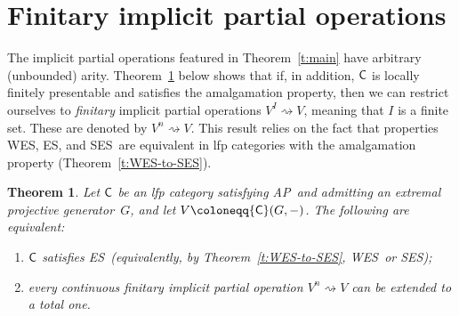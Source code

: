 \documentclass[a4paper,10pt,reqno]{amsart}
\newtheorem{theorem}{Theorem}[section]
\theoremstyle{definition}
\theoremstyle{remark}
\newcommand{\cat}{{\sf C}}								%
\newcommand{\ES}{\textnormal{ES}}
\newcommand{\WES}{\textnormal{WES}}
\newcommand{\SES}{\textnormal{SES}}
\newcommand{\AP}{\textnormal{AP}}
\begin{document}
\section{Finitary implicit partial operations}\label{s:finitary-implicit-partial-operations}

The implicit partial operations featured in Theorem~\ref{t:main} have arbitrary (unbounded) arity. Theorem~\ref{t:SES-vs-implicit-operations-with-amalgam} below shows that if, in addition, $\cat$ is locally finitely presentable and satisfies the amalgamation property, then we can restrict ourselves to \emph{finitary} implicit partial operations $V^{I} \rightsquigarrow V$, meaning that $I$ is a finite set. These are denoted by $V^{n} \rightsquigarrow V$. This result relies on the fact that properties \WES, \ES, and \SES~are equivalent in lfp categories with the amalgamation property (Theorem~\ref{t:WES-to-SES}).
%

\begin{theorem}\label{t:SES-vs-implicit-operations-with-amalgam}
Let $\cat$ be an lfp category satisfying \AP~and admitting an extremal projective generator~$G$, and let $V\coloneqq \cat(G,-)$. The following are equivalent:
\begin{enumerate}[label=(\arabic*)]
\item\label{i:Cat-satisfies-SES-with-AP} $\cat$ satisfies \ES~(equivalently, by Theorem~\ref{t:WES-to-SES}, \WES~or \SES);
\item\label{i:continuous-finitary-admits-extension} every continuous finitary implicit partial operation $V^{n} \rightsquigarrow V$ can be extended to a total one.
\end{enumerate}
\end{theorem}
\end{document}
